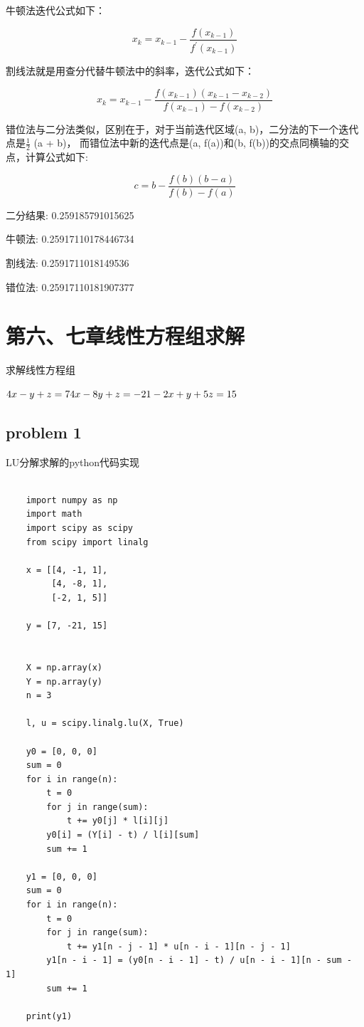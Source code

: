 \documentclass[UTF8]{ctexart}
\begin{document}
牛顿法迭代公式如下：

$$x_{k}=x_{k-1}-\frac{f\left(x_{k-1}\right)}{f^{\prime}\left(x_{k-1}\right)}$$

割线法就是用查分代替牛顿法中的斜率，迭代公式如下：

$$
x_{k}=x_{k-1}-\frac{f\left(x_{k-1}\right)\left(x_{k-1}-x_{k-2}\right)}{f\left(x_{k-1}\right)-f\left(x_{k-2}\right)}
$$


错位法与二分法类似，区别在于，对于当前迭代区域(a, b)，二分法的下一个迭代点是$\frac{1}{2}$ (a + b)，
而错位法中新的迭代点是(a, f(a))和(b, f(b))的交点同横轴的交点，计算公式如下:

$$
c=b-\frac{f(b)(b-a)}{f(b)-f(a)}
$$



二分结果: 0.259185791015625

牛顿法: 0.25917110178446734

割线法: 0.2591711018149536

错位法: 0.25917110181907377
\newpage
\section{第六、七章线性方程组求解}
求解线性方程组

\begin{math} 
\\
4 x-y+z =7 \\ 
4 x-8 y+z =-21 \\
-2 x+y+5 z =15 
\end{math}
\subsection{problem 1}
LU分解求解的python代码实现
\begin{lstlisting}

	import numpy as np
	import math
	import scipy as scipy
	from scipy import linalg

	x = [[4, -1, 1],
	     [4, -8, 1],
	     [-2, 1, 5]]

	y = [7, -21, 15]

	
	X = np.array(x)
	Y = np.array(y)
	n = 3

	l, u = scipy.linalg.lu(X, True)

	y0 = [0, 0, 0]
	sum = 0
	for i in range(n):
	    t = 0
	    for j in range(sum):
	        t += y0[j] * l[i][j]
	    y0[i] = (Y[i] - t) / l[i][sum]
	    sum += 1

	y1 = [0, 0, 0]
	sum = 0
	for i in range(n):
	    t = 0
	    for j in range(sum):
	        t += y1[n - j - 1] * u[n - i - 1][n - j - 1]
	    y1[n - i - 1] = (y0[n - i - 1] - t) / u[n - i - 1][n - sum - 1]
	    sum += 1

	print(y1)

\end{lstlisting}
\end{document}
